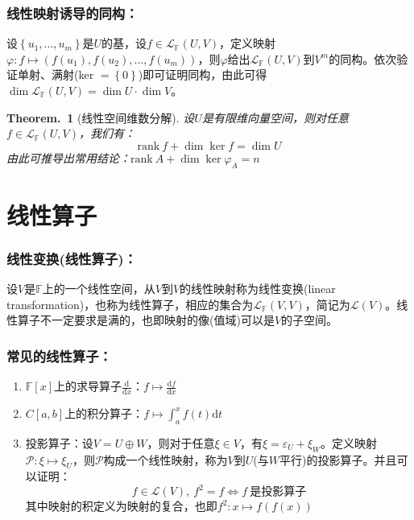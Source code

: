 \documentclass[zihao=5,UTF8]{report}
\theoremstyle{mystyle} %
\newtheorem{theorem}{Theorem.\,}
\begin{document}
\subsubsection{线性映射诱导的同构：}
设$\left\{u_1,...,u_m\right\}$是$U$的基，设$f \in \mathscr{L}_{\mathbb{F}}(U,V)$，定义映射$\varphi : f \longmapsto \left( f(u_1),f(u_2),...,f(u_m)\right)$，则$\varphi$给出$\mathscr{L}_{\mathbb{F}}(U,V)$到$V^m$的同构。{\color{gray}\small 依次验证单射、满射(ker $ = \left\{0\right\}$)即可证明同构，由此可得$\dim \mathscr{L}_{\mathbb{F}}(U,V) = \dim U \cdot \dim V$。}
\begin{theorem}[线性空间维数分解]
    设$U$是有限维向量空间，则对任意$f \in \mathscr{L}_{\mathbb{F}}(U,V)$，我们有：
    \begin{equation*}
        \text{rank}\   f + \dim \ker f = \dim U
    \end{equation*}
    {\color{gray}\small 由此可推导出常用结论：$\text{rank}\  A + \dim \ker \varphi_A = n$}
\end{theorem}

\section{线性算子}
\subsubsection{线性变换(线性算子)：}
设$V$是$\mathbb{F}$上的一个线性空间，从$V$到$V$的线性映射称为线性变换(linear transformation)，也称为线性算子，相应的集合为$\mathscr{L}_{\mathbb{F}}(V,V)$，简记为$\mathscr{L}(V)$。{\color{gray}\small 线性算子不一定要求是满的，也即映射的像(值域)可以是$V$的子空间。}


\subsubsection{常见的线性算子：}
\begin{enumerate}
    \item $\mathbb{F}[x]$上的求导算子$\frac{\mathrm{d}}{\mathrm{d}x}$：$f \longmapsto \frac{\mathrm{d}f}{\mathrm{d}x}$
    \item $C[a,b]$上的积分算子：$f \longmapsto \int_{a}^{x}f(t)\mathrm{d}t$
    \item 投影算子：设$V = U \oplus W$，则对于任意$\xi  \in V$，有$\xi  = \varepsilon_U + \xi _W$。定义映射$\mathscr{P}: \xi  \longmapsto \xi_U$，则$\mathscr{P}$构成一个线性映射，称为$V$到$U$(与$W$平行)的投影算子。并且可以证明：
    \begin{equation*}
        f \in \mathscr{L}(V),\ f^2 = f \Longleftrightarrow f\ \text{是投影算子}
    \end{equation*}
    其中映射的积定义为映射的复合，也即$f^2:x \longmapsto f(f(x))$
\end{enumerate}
\end{document}
